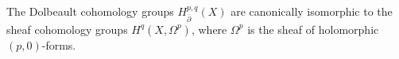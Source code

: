 The Dolbeault cohomology groups $H_{\overline{\partial}}^{p,q}(X)$ are canonically isomorphic to the sheaf cohomology groups $H^q(X, \Omega^p)$, where $\Omega^p$ is the sheaf of holomorphic $(p,0)$-forms.
